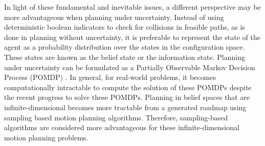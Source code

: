 \documentclass[Afour,sageh,times]{sagej}
\begin{document}
In light of these fundamental and inevitable issues, a different perspective may be more advantageous when planning under uncertainty. Instead of using deterministic boolean indicators to check for collisions in feasible paths, as is done in planning without uncertainty, it is preferable to represent the state of the agent as a probability distribution over the states in the configuration space. 
These states are known as the belief state or the information state. Planning under uncertainty can be formulated as a Partially Observable Markov Decision Process (POMDP) \cite{astrom1965optimal_pomdp_1,smallwood1973optimal_pomdp_2,kaelbling1998planning_pomdp_3}.
In general, for real-world problems, it becomes computationally intractable to compute the solution of these POMDPs despite the recent progress to solve these POMDPs. Planning in belief spaces that are infinite-dimensional becomes more tractable from a generated roadmap using sampling based motion planning algorithms. Therefore, sampling-based algorithms are considered more advantageous for these infinite-dimensional motion planning problems.
\end{document}
